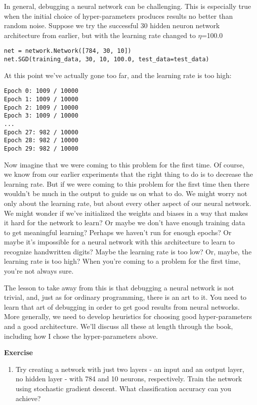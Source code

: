 In general, debugging a neural network can be challenging. This is especially true when the initial choice of hyper-parameters produces results no better than random noise. Suppose we try the successful 30 hidden neuron network architecture from earlier, but with the learning rate changed to $\eta$=100.0
\begin{lstlisting}
net = network.Network([784, 30, 10])
net.SGD(training_data, 30, 10, 100.0, test_data=test_data)
\end{lstlisting}
At this point we've actually gone too far, and the learning rate is too high:
\begin{lstlisting}
Epoch 0: 1009 / 10000
Epoch 1: 1009 / 10000
Epoch 2: 1009 / 10000
Epoch 3: 1009 / 10000
...
Epoch 27: 982 / 10000
Epoch 28: 982 / 10000
Epoch 29: 982 / 10000
\end{lstlisting}
Now imagine that we were coming to this problem for the first time. Of course, we know from our earlier experiments that the right thing to do is to decrease the learning rate. But if we were coming to this problem for the first time then there wouldn't be much in the output to guide us on what to do. We might worry not only about the learning rate, but about every other aspect of our neural network. We might wonder if we've initialized the weights and biases in a way that makes it hard for the network to learn? Or maybe we don't have enough training data to get meaningful learning? Perhaps we haven't run for enough epochs? Or maybe it's impossible for a neural network with this architecture to learn to recognize handwritten digits? Maybe the learning rate is too low? Or, maybe, the learning rate is too high? When you're coming to a problem for the first time, you're not always sure.

The lesson to take away from this is that debugging a neural network is not trivial, and, just as for ordinary programming, there is an art to it. You need to learn that art of debugging in order to get good results from neural networks. More generally, we need to develop heuristics for choosing good hyper-parameters and a good architecture. We'll discuss all these at length through the book, including how I chose the hyper-parameters above.

\textbf{Exercise}
\begin{enumerate}
\item 
 Try creating a network with just two layers - an input and an output layer, no hidden layer - with 784 and 10 neurons, respectively. Train the network using stochastic gradient descent. What classification accuracy can you achieve? 
\end{enumerate}
 
